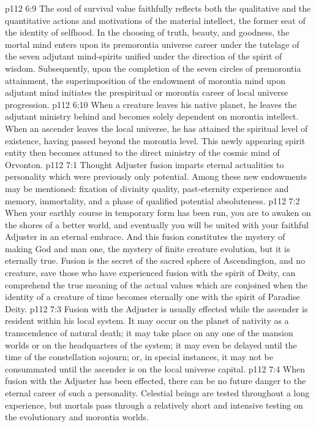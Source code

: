 \vs p112 6:9 The soul of survival value faithfully reflects both the qualitative and the quantitative actions and motivations of the material intellect, the former seat of the identity of selfhood. In the choosing of truth, beauty, and goodness, the mortal mind enters upon its premorontia universe career under the tutelage of the seven adjutant mind\hyp{}spirits unified under the direction of the spirit of wisdom. Subsequently, upon the completion of the seven circles of premorontia attainment, the superimposition of the endowment of morontia mind upon adjutant mind initiates the prespiritual or morontia career of local universe progression.
\vs p112 6:10 \pc When a creature leaves his native planet, he leaves the adjutant ministry behind and becomes solely dependent on morontia intellect. When an ascender leaves the local universe, he has attained the spiritual level of existence, having passed beyond the morontia level. This newly appearing spirit entity then becomes attuned to the direct ministry of the cosmic mind of Orvonton.
\vs p112 7:1 Thought Adjuster fusion imparts eternal actualities to personality which were previously only potential. Among these new endowments may be mentioned: fixation of divinity quality, past\hyp{}eternity experience and memory, immortality, and a phase of qualified potential absoluteness.
\vs p112 7:2 \pc When your earthly course in temporary form has been run, you are to awaken on the shores of a better world, and eventually you will be united with your faithful Adjuster in an eternal embrace. And this fusion constitutes the mystery of making God and man one, the mystery of finite creature evolution, but it is eternally true. Fusion is the secret of the sacred sphere of Ascendington, and no creature, save those who have experienced fusion with the spirit of Deity, can comprehend the true meaning of the actual values which are conjoined when the identity of a creature of time becomes eternally one with the spirit of Paradise Deity.
\vs p112 7:3 Fusion with the Adjuster is usually effected while the ascender is resident within his local system. It may occur on the planet of nativity as a transcendence of natural death; it may take place on any one of the mansion worlds or on the headquarters of the system; it may even be delayed until the time of the constellation sojourn; or, in special instances, it may not be consummated until the ascender is on the local universe capital.
\vs p112 7:4 When fusion with the Adjuster has been effected, there can be no future danger to the eternal career of such a personality. Celestial beings are tested throughout a long experience, but mortals pass through a relatively short and intensive testing on the evolutionary and morontia worlds.
